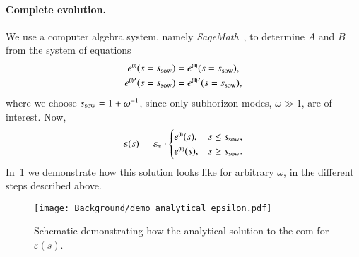     \paragraph{Complete evolution.} %
    We use a computer algebra system, namely \textit{SageMath}~\citep{sagemath}, to determine $A$ and $B$ from the system of equations
    \begin{equation}
        \begin{split}
            e^{\text{{\tiny{\textsf{\textbf{(I)}}}}}}(s=s_\mathrm{sow}) &= e^{\text{{\tiny{\textsf{\textbf{(II)}}}}}}(s=s_\mathrm{sow}), \\
            {e^{\text{{\tiny{\textsf{\textbf{(I)}}}}}}}'(s=s_\mathrm{sow}) &= {e^{\text{{\tiny{\textsf{\textbf{(II)}}}}}}}'(s=s_\mathrm{sow}),
        \end{split}
    \end{equation}
    where we choose $s_\mathrm{sow}=1+\omega^{-1}$, since only subhorizon modes, $\omega\gg 1$, are of interest. Now,
    \begin{equation}\label{eq:pertwalls:untitled1:eps_s_complete_MD}
        \varepsilon(s) =  \varepsilon_\ast \cdot \begin{cases}
            e^{\text{\eqregimenum{I}}} (s),  & s \leq s\ped{sow}, \\
            e^{\text{\eqregimenum{II}}}(s),  & s \geq s\ped{sow}.
        \end{cases}
    \end{equation}
    In~\cref{fig:pertwalls:untitled1:demo_analytical_epsilon} we demonstrate how this solution looks like for arbitrary $\omega$, in the different steps described above. 
    \begin{figure}[H]
        \centering
        \texttt{[image: Background/demo\_analytical\_epsilon.pdf]}
        \caption{Schematic demonstrating how the analytical solution to the eom for $\varepsilon(s)$.}  
        \label{fig:pertwalls:untitled1:demo_analytical_epsilon}
    \end{figure}

